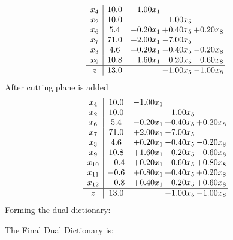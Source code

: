 \documentclass[8pt]{article}
\begin{document}
\[\begin{array}{c| c c@{\hskip 2pt} c@{\hskip 2pt} c@{\hskip 2pt} }
 x_{4}   &  10.0 & -1.00 x_{1} &    &   \\
 x_{2}   &  10.0  &   & -1.00 x_{5} &   \\
 x_{6}   &  5.4 & -0.20 x_{1} & +  0.40 x_{5} & +  0.20 x_{8}\\
 x_{7}   &  71.0 & +  2.00 x_{1} & -7.00 x_{5} &   \\
 x_{3}   &  4.6 & +  0.20 x_{1} & -0.40 x_{5} & -0.20 x_{8}\\
 x_{9}   &  10.8 & +  1.60 x_{1} & -0.20 x_{5} & -0.60 x_{8}\\
\hline
z    &  13.0  &   & -1.00 x_{5} & -1.00 x_{8}\\
\end{array}\]
 After cutting plane is added 
\[\begin{array}{c| c c@{\hskip 2pt} c@{\hskip 2pt} c@{\hskip 2pt} }
 x_{4}   &  10.0 & -1.00 x_{1} &    &   \\
 x_{2}   &  10.0  &   & -1.00 x_{5} &   \\
 x_{6}   &  5.4 & -0.20 x_{1} & +  0.40 x_{5} & +  0.20 x_{8}\\
 x_{7}   &  71.0 & +  2.00 x_{1} & -7.00 x_{5} &   \\
 x_{3}   &  4.6 & +  0.20 x_{1} & -0.40 x_{5} & -0.20 x_{8}\\
 x_{9}   &  10.8 & +  1.60 x_{1} & -0.20 x_{5} & -0.60 x_{8}\\
 x_{10}   &  -0.4 & +  0.20 x_{1} & +  0.60 x_{5} & +  0.80 x_{8}\\
 x_{11}   &  -0.6 & +  0.80 x_{1} & +  0.40 x_{5} & +  0.20 x_{8}\\
 x_{12}   &  -0.8 & +  0.40 x_{1} & +  0.20 x_{5} & +  0.60 x_{8}\\
\hline
z    &  13.0  &   & -1.00 x_{5} & -1.00 x_{8}\\
\end{array}\]
Forming the dual dictionary:

The Final Dual Dictionary is: 
\end{document}
